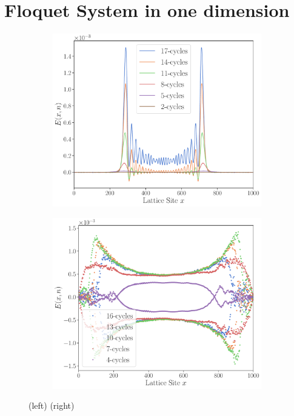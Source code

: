 \documentclass[11pt, a4paper]{article}
\theoremstyle{definition} %
\begin{document}
\section{Floquet System in one dimension}


\begin{figure}[h]
\centering
\begin{subfigure}[t]{0.49\textwidth}
	\centering
	\includegraphics[width =\textwidth]{Energy_Density1}
\end{subfigure}
\begin{subfigure}[t]{0.49\textwidth}
	\centering
	\includegraphics[width =\textwidth]{Energy_Density2}
\end{subfigure}
\caption{(left) (right)}
\end{figure}
\end{document}
